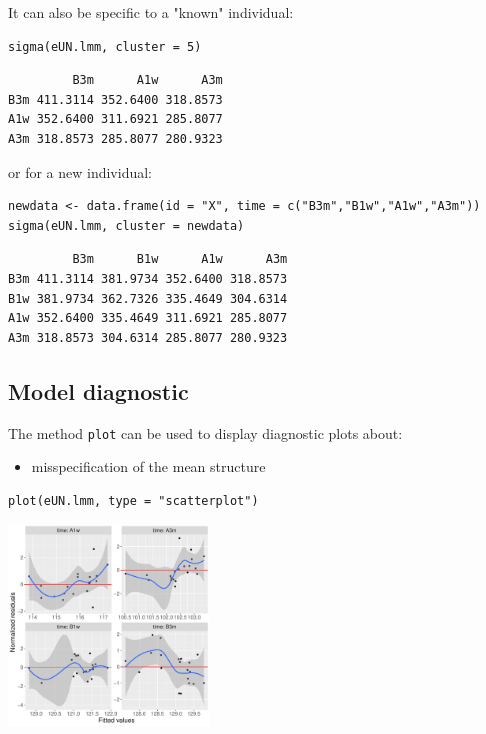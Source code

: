 \documentclass[12pt]{article}
\begin{document}
It can also be specific to a "known" individual:
\lstset{language=r,label= ,caption= ,captionpos=b,numbers=none}
\begin{lstlisting}
sigma(eUN.lmm, cluster = 5)
\end{lstlisting}

\begin{verbatim}
         B3m      A1w      A3m
B3m 411.3114 352.6400 318.8573
A1w 352.6400 311.6921 285.8077
A3m 318.8573 285.8077 280.9323
\end{verbatim}


or for a new individual:
\lstset{language=r,label= ,caption= ,captionpos=b,numbers=none}
\begin{lstlisting}
newdata <- data.frame(id = "X", time = c("B3m","B1w","A1w","A3m"))
sigma(eUN.lmm, cluster = newdata)
\end{lstlisting}

\begin{verbatim}
         B3m      B1w      A1w      A3m
B3m 411.3114 381.9734 352.6400 318.8573
B1w 381.9734 362.7326 335.4649 304.6314
A1w 352.6400 335.4649 311.6921 285.8077
A3m 318.8573 304.6314 285.8077 280.9323
\end{verbatim}



\clearpage

\subsection{Model diagnostic}
\label{sec:org4a54599}

The method \texttt{plot} can be used to display diagnostic plots about:
\begin{itemize}
\item misspecification of the mean structure
\end{itemize}
\lstset{language=r,label= ,caption= ,captionpos=b,numbers=none}
\begin{lstlisting}
plot(eUN.lmm, type = "scatterplot")
\end{lstlisting}

\begin{center}
\includegraphics[width=0.4\textwidth]{./figures/diag-scatterplot.pdf}
\end{center}
\end{document}
